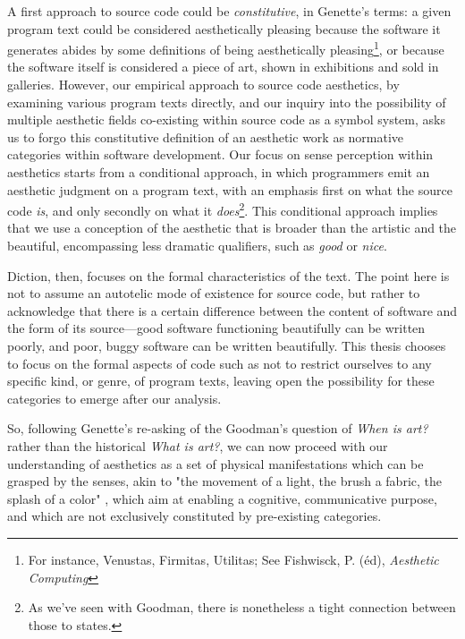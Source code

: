 A first approach to source code could be \emph{constitutive}, in Genette's terms: a given program text could be considered aesthetically pleasing because the software it generates abides by some definitions of being aesthetically pleasing\footnote{For instance, Venustas, Firmitas, Utilitas; See Fishwisck, P. (éd), \emph{Aesthetic Computing}}, or because the software itself is considered a piece of art, shown in exhibitions and sold in galleries. However, our empirical approach to source code aesthetics, by examining various program texts directly, and our inquiry into the possibility of multiple aesthetic fields co-existing within source code as a symbol system, asks us to forgo this constitutive definition of an aesthetic work as normative categories within software development. Our focus on sense perception within aesthetics starts from a conditional approach, in which programmers emit an aesthetic judgment on a program text, with an emphasis first on what the source code \emph{is}, and only secondly on what it \emph{does}\footnote{As we've seen with Goodman, there is nonetheless a tight connection between those to states.}. This conditional approach implies that we use a conception of the aesthetic that is broader than the artistic and the beautiful, encompassing less dramatic qualifiers, such as \emph{good} or \emph{nice}.

Diction, then, focuses on the formal characteristics of the text. The point here is not to assume an autotelic mode of existence for source code, but rather to acknowledge that there is a certain difference between the content of software and the form of its source—good software functioning beautifully can be written poorly, and poor, buggy software can be written beautifully. This thesis chooses to focus on the formal aspects of code such as not to restrict ourselves to any specific kind, or genre, of program texts, leaving open the possibility for these categories to emerge after our analysis.

So, following Genette's re-asking of the Goodman's question of \emph{When is art?} rather than the historical \emph{What is art?}, we can now proceed with our understanding of aesthetics as a set of physical manifestations which can be grasped by the senses, akin to "the movement of a light, the brush a fabric, the splash of a color" \citep{ranciere_aisthesis_2013}, which aim at enabling a cognitive, communicative purpose, and which are not exclusively constituted by pre-existing categories.

